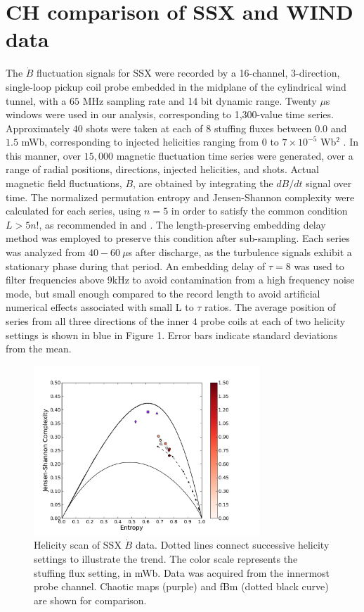 \documentclass[aps,pre,twocolumn,secnumarabic,nobalancelastpage,amsmath,amssymb,
nofootinbib]{revtex4-1}
\begin{document}
\section{CH comparison of SSX and WIND data}
The $\dot{B}$ fluctuation signals for SSX  were recorded by a 16-channel, 3-direction, single-loop pickup coil probe embedded in the midplane of the cylindrical wind tunnel, with a $65$ MHz sampling rate and 14 bit dynamic range. Twenty $\mu$s windows were used in our analysis, corresponding to 1,300-value time series. Approximately $40$ shots were taken at each of $8$ stuffing fluxes between $0.0$ and $1.5$ mWb, corresponding to injected helicities ranging from $0$ to $7 \times 10^{-5}$ Wb$^2$ \cite{schaffner2014}. In this manner, over $15,000$ magnetic fluctuation time series were generated, over a range of radial positions, directions, injected helicities, and shots. Actual magnetic field fluctuations, $B$, are obtained by integrating the $dB/dt$ signal over time. The normalized permutation entropy and Jensen-Shannon complexity were calculated for each series, using $n=5$ in order to satisfy the common condition $L > 5n!$, as recommended in \cite{amigo2008} and \cite{riedl2013}. The length-preserving embedding delay method was employed to preserve this condition after sub-sampling. Each series was analyzed from $40-60~\mu$s after discharge, as the turbulence signals exhibit a stationary phase during that period. An embedding delay of $\tau=8$ was used to filter frequencies above 9kHz to avoid contamination from a high frequency noise mode, but small enough compared to the record length to avoid artificial numerical effects associated with small L to $\tau$ ratios. The average position of series from all three directions of the inner $4$ probe coils at each of two helicity settings is shown in blue in Figure 1. Error bars indicate standard deviations from the mean.  

\begin{figure}[!htbp]
\centerline{
\includegraphics[width=8.5cm]{fig2.png}}
\caption{\label{fig:helscan} Helicity scan of SSX $\dot{B}$ data. Dotted lines connect successive helicity settings to illustrate the trend. The color scale represents the stuffing flux setting, in mWb.  Data was acquired from the innermost probe channel. Chaotic maps (purple) and fBm (dotted black curve) are shown for comparison.}
\end{figure}
\end{document}
